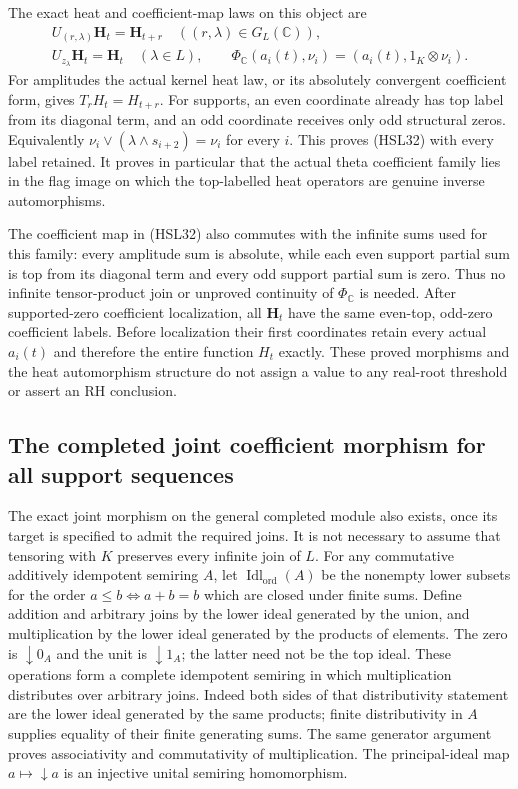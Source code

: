 The exact heat and coefficient-map laws on this object are
\begin{equation}\tag{HSL32}
 \begin{gathered}
 U_{(r,\lambda)}\mathbf H_t=\mathbf H_{t+r}
         \quad((r,\lambda)\in G_L(\mathbb C)),\\
 U_{z_\lambda}\mathbf H_t=\mathbf H_t
                      \quad(\lambda\in L),\qquad
 \Phi_{\mathbb C}(a_i(t),\nu_i)
                =(a_i(t),1_K\otimes\nu_i).
 \end{gathered}
\end{equation}
For amplitudes the actual kernel heat law, or its
absolutely convergent coefficient form, gives
$T_rH_t=H_{t+r}$. For supports, an even coordinate already
has top label from its diagonal term, and an odd coordinate
receives only odd structural zeros. Equivalently
$\nu_i\vee(\lambda\wedge s_{i+2})=\nu_i$ for every $i$.
This proves (HSL32) with every label retained.
It proves in particular that the actual theta coefficient
family lies in the flag image on which the top-labelled
heat operators are genuine inverse automorphisms.

The coefficient map in (HSL32) also commutes with the
infinite sums used for this family: every amplitude sum is
absolute, while each even support partial sum is top from
its diagonal term and every odd support partial sum is zero.
Thus no infinite tensor-product join or unproved
continuity of $\Phi_{\mathbb C}$ is needed.
After supported-zero coefficient localization, all
$\mathbf H_t$ have the same even-top, odd-zero coefficient
labels. Before localization their first coordinates retain
every actual $a_i(t)$ and therefore the entire function
$H_t$ exactly. These proved morphisms and the heat
automorphism structure do not assign a value to any
real-root threshold or assert an RH conclusion.

\subsection{The completed joint coefficient morphism for all support sequences}

The exact joint morphism on the general completed module
also exists, once its target is specified to admit the
required joins. It is not necessary to assume that tensoring
with $K$ preserves every infinite join of $L$.
For any commutative additively idempotent semiring $A$, let
$\operatorname{Idl}_{\mathrm{ord}}(A)$ be the nonempty lower
subsets for the order $a\le b\Longleftrightarrow a+b=b$
which are closed under finite sums. Define addition and
arbitrary joins by the lower ideal generated by the union,
and multiplication by the lower ideal generated by the
products of elements. The zero is $\downarrow0_A$ and the
unit is $\downarrow1_A$; the latter need not be the top ideal.
These operations form a complete idempotent semiring in
which multiplication distributes over arbitrary joins.
Indeed both sides of that distributivity statement are
the lower ideal generated by the same products; finite
distributivity in $A$ supplies equality of their finite
generating sums. The same generator argument proves
associativity and commutativity of multiplication.
The principal-ideal map $a\mapsto\downarrow a$ is an
injective unital semiring homomorphism.

